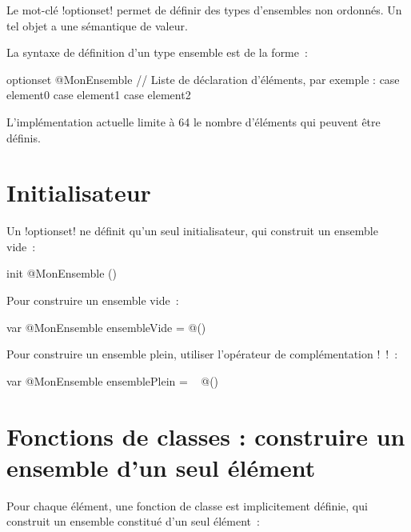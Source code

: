 




Le mot-clé \ggsq!optionset! permet de définir des types d'ensembles non ordonnés. Un tel objet a une sémantique de valeur.

La syntaxe de définition d'un type ensemble est de la forme~:

\begin{galgas4}
optionset @MonEnsemble {
  // Liste de déclaration d'éléments, par exemple :
  case element0
  case element1
  case element2
}
\end{galgas4}

L'implémentation actuelle limite à 64 le nombre d'éléments qui peuvent être définis.

\section{Initialisateur}

Un \ggsq!optionset! ne définit qu'un seul initialisateur, qui construit un ensemble vide~:
\begin{galgas4}
init @MonEnsemble ()
\end{galgas4}

Pour construire un ensemble vide~:
\begin{galgas4}
var @MonEnsemble ensembleVide = @()
\end{galgas4}

Pour construire un ensemble plein, utiliser l'opérateur de complémentation \ggsq!~!~:
\begin{galgas4}
var @MonEnsemble ensemblePlein = ~ @()
\end{galgas4}










\section{Fonctions de classes : construire un ensemble d'un seul élément}

Pour chaque élément, une fonction de classe est implicitement définie, qui construit un ensemble constitué d'un seul élément~:

